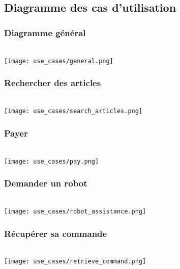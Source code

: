 \subsection{Diagramme des cas d'utilisation}
	\subsubsection{Diagramme général}
		~\\
		\texttt{[image: use\_cases/general.png]}
	\subsubsection{Rechercher des articles}
		~\\
		\texttt{[image: use\_cases/search\_articles.png]}
	\subsubsection{Payer}
		~\\
		\texttt{[image: use\_cases/pay.png]}
	\subsubsection{Demander un \gls{robot}}
		~\\
		\texttt{[image: use\_cases/robot\_assistance.png]}
	\subsubsection{Récupérer sa commande}
		~\\
		\texttt{[image: use\_cases/retrieve\_command.png]}